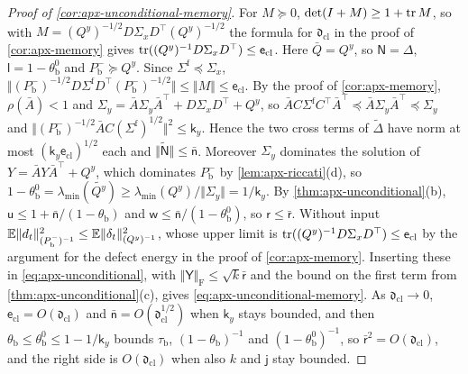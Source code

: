 \begin{proof}[Proof of \cref{cor:apx-unconditional-memory}]
For $M\succeq0$, $\det(I+M)\ge1+\operatorname{tr} M$, so with $M=(Q^y)^{-1/2}D\Sigma_xD^\top(Q^y)^{-1/2}$ the formula for $\mathfrak d_{\mathrm{cl}}$ in the proof of \cref{cor:apx-memory} gives $\operatorname{tr}((Q^y)^{-1}D\Sigma_xD^\top)\le\mathsf e_{\mathrm{cl}}$. Here $\bar Q=Q^y$, so $\mathsf N=\Delta$, $\mathsf l=1-\theta^0_{\mathrm b}$ and $P^-_{\mathrm b}\succeq Q^y$. Since $\Sigma^{\mathrm f}\preceq\Sigma_x$, $\Vert(P^-_{\mathrm b})^{-1/2}D\Sigma^{\mathrm f}D^\top(P^-_{\mathrm b})^{-1/2}\Vert\le\Vert M\Vert\le\mathsf e_{\mathrm{cl}}$. By the proof of \cref{cor:apx-memory}, $\rho(\bar A)<1$ and $\Sigma_y=\bar A\Sigma_y\bar A^\top+D\Sigma_xD^\top+Q^y$, so $\bar AC\Sigma^{\mathrm f}C^\top\bar A^\top\preceq\bar A\Sigma_y\bar A^\top\preceq\Sigma_y$ and $\Vert(P^-_{\mathrm b})^{-1/2}\bar AC(\Sigma^{\mathrm f})^{1/2}\Vert^2\le\mathsf k_y$. Hence the two cross terms of $\tilde\Delta$ have norm at most $(\mathsf k_y\mathsf e_{\mathrm{cl}})^{1/2}$ each and $\Vert\tilde{\mathsf N}\Vert\le\bar{\mathsf n}$. Moreover $\Sigma_y$ dominates the solution of $Y=\bar AY\bar A^\top+Q^y$, which dominates $P^-_{\mathrm b}$ by \cref{lem:apx-riccati}(d), so $1-\theta^0_{\mathrm b}=\lambda_{\min}(\tilde{Q^y})\ge\lambda_{\min}(Q^y)/\Vert\Sigma_y\Vert=1/\mathsf k_y$. By \cref{thm:apx-unconditional}(b), $\mathsf u\le1+\bar{\mathsf n}/(1-\theta_{\mathrm b})$ and $\mathsf w\le\bar{\mathsf n}/(1-\theta^0_{\mathrm b})$, so $\mathsf r\le\bar{\mathsf r}$. Without input $\mathbb{E}\Vert d_t\Vert^2_{(P^-_{\mathrm b})^{-1}}\le\mathbb{E}\Vert\delta_t\Vert^2_{(Q^y)^{-1}}$, whose upper limit is $\operatorname{tr}((Q^y)^{-1}D\Sigma_xD^\top)\le\mathsf e_{\mathrm{cl}}$ by the argument for the defect energy in the proof of \cref{cor:apx-memory}. Inserting these in \cref{eq:apx-unconditional}, with $\Vert\mathsf Y\Vert_{\mathrm F}\le\sqrt k\bar{\mathsf r}$ and the bound on the first term from \cref{thm:apx-unconditional}(c), gives \cref{eq:apx-unconditional-memory}. As $\mathfrak d_{\mathrm{cl}}\to0$, $\mathsf e_{\mathrm{cl}}=O(\mathfrak d_{\mathrm{cl}})$ and $\bar{\mathsf n}=O(\mathfrak d_{\mathrm{cl}}^{1/2})$ when $\mathsf k_y$ stays bounded, and then $\theta_{\mathrm b}\le\theta^0_{\mathrm b}\le1-1/\mathsf k_y$ bounds $\tau_{\mathrm b}$, $(1-\theta_{\mathrm b})^{-1}$ and $(1-\theta^0_{\mathrm b})^{-1}$, so $\bar{\mathsf r}^2=O(\mathfrak d_{\mathrm{cl}})$, and the right side is $O(\mathfrak d_{\mathrm{cl}})$ when also $k$ and $\mathsf j$ stay bounded.
\end{proof}

